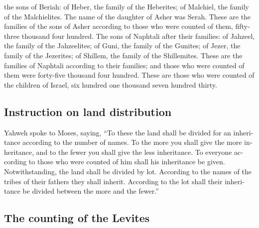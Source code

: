 \begin{paracol}{2}
\begin{otherlanguage}{english}
the sons of Beriah: of Heber, the family of the Heberites; of Malchiel,
the family of the Malchielites.  The name of the daughter
of Asher was Serah.  These are the families of the sons
of Asher according to those who were counted of them, fifty-three
thousand four hundred.  The sons of Naphtali after their
families: of Jahzeel, the family of the Jahzeelites; of Guni, the family
of the Gunites;  of Jezer, the family of the Jezerites;
of Shillem, the family of the Shillemites.  These are the
families of Naphtali according to their families; and those who were
counted of them were forty-five thousand four hundred. 
These are those who were counted of the children of Israel, six hundred
one thousand seven hundred thirty.

\hypertarget{instruction-on-land-distribution}{%
\subsection{Instruction on land
distribution}\label{instruction-on-land-distribution}}

 Yahweh spoke to Moses, saying,  ``To
these the land shall be divided for an inheritance according to the
number of names.  To the more you shall give the more
inheritance, and to the fewer you shall give the less inheritance. To
everyone according to those who were counted of him shall his
inheritance be given.  Notwithstanding, the land shall be
divided by lot. According to the names of the tribes of their fathers
they shall inherit.  According to the lot shall their
inheritance be divided between the more and the fewer.''

\hypertarget{the-counting-of-the-levites}{%
\subsection{The counting of the
Levites}\label{the-counting-of-the-levites}}


\end{otherlanguage}
\end{paracol}
